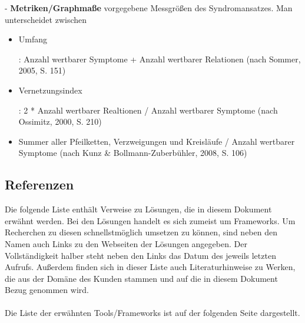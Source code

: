 \documentclass[enabledeprecatedfontcommands,fontsize=11pt,paper=a4,twoside]{scrartcl}
\newcounter{one}
\begin{document}
	- \textbf{\hypertarget{Metriken}{Metriken/Graphmaße}} vorgegebene Messgrößen des Syndromansatzes. Man unterscheidet zwischen
	\begin{itemize}
		\item \hypertarget{Umfang}{Umfang}: Anzahl wertbarer Symptome + Anzahl wertbarer Relationen (nach Sommer, 2005, S. 151)
		\item \hypertarget{Vernetzungsindex}{Vernetzungsindex}: 2 * Anzahl wertbarer Realtionen / Anzahl wertbarer Symptome (nach Ossimitz, 2000, S. 210)
		\item Summer aller Pfeilketten, Verzweigungen und Kreisläufe / Anzahl wertbarer Symptome (nach Kunz \& Bollmann-Zuberbühler, 2008, S. 106)
	\end{itemize}
	
	\newpage
	\subsection{Referenzen} 
	Die folgende Liste enthält Verweise zu Lösungen, die in diesem Dokument erwähnt werden. Bei den Lösungen handelt es sich zumeist um Frameworks. Um Recherchen zu diesen schnellstmöglich umsetzen zu können, sind neben den Namen auch Links zu den Webseiten der Lösungen angegeben. Der Vollständigkeit halber steht neben den Links das Datum des jeweils letzten Aufrufs. Außerdem finden sich in dieser Liste auch Literaturhinweise zu Werken, die aus der Domäne des Kunden stammen und auf die in diesem Dokument Bezug genommen wird. \\ \\
	Die Liste der erwähnten Tools/Frameworks ist auf der folgenden Seite dargestellt. \\
	\newpage
\end{document}
